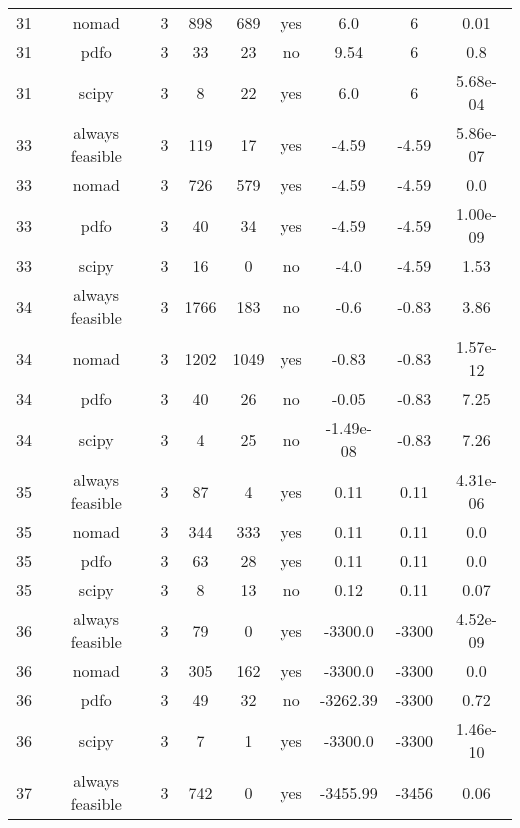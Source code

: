 \begin{scriptsize}
\begin{center}
\begin{longtable}{ccccccccc}
 31 &           nomad &  3 &    898 &    689 &     yes &         6.0 &           6 &     0.01\\
 31 &            pdfo &  3 &     33 &     23 &      no &        9.54 &           6 &      0.8\\
 31 &           scipy &  3 &      8 &     22 &     yes &         6.0 &           6 & 5.68e-04\\
 33 & always feasible &  3 &    119 &     17 &     yes &       -4.59 &       -4.59 & 5.86e-07\\
 33 &           nomad &  3 &    726 &    579 &     yes &       -4.59 &       -4.59 &      0.0\\
 33 &            pdfo &  3 &     40 &     34 &     yes &       -4.59 &       -4.59 & 1.00e-09\\
 33 &           scipy &  3 &     16 &      0 &      no &        -4.0 &       -4.59 &     1.53\\
 34 & always feasible &  3 &   1766 &    183 &      no &        -0.6 &       -0.83 &     3.86\\
 34 &           nomad &  3 &   1202 &   1049 &     yes &       -0.83 &       -0.83 & 1.57e-12\\
 34 &            pdfo &  3 &     40 &     26 &      no &       -0.05 &       -0.83 &     7.25\\
 34 &           scipy &  3 &      4 &     25 &      no &   -1.49e-08 &       -0.83 &     7.26\\
 35 & always feasible &  3 &     87 &      4 &     yes &        0.11 &        0.11 & 4.31e-06\\
 35 &           nomad &  3 &    344 &    333 &     yes &        0.11 &        0.11 &      0.0\\
 35 &            pdfo &  3 &     63 &     28 &     yes &        0.11 &        0.11 &      0.0\\
 35 &           scipy &  3 &      8 &     13 &      no &        0.12 &        0.11 &     0.07\\
 36 & always feasible &  3 &     79 &      0 &     yes &     -3300.0 &       -3300 & 4.52e-09\\
 36 &           nomad &  3 &    305 &    162 &     yes &     -3300.0 &       -3300 &      0.0\\
 36 &            pdfo &  3 &     49 &     32 &      no &    -3262.39 &       -3300 &     0.72\\
 36 &           scipy &  3 &      7 &      1 &     yes &     -3300.0 &       -3300 & 1.46e-10\\
 37 & always feasible &  3 &    742 &      0 &     yes &    -3455.99 &       -3456 &     0.06\\

\end{longtable}
\end{center}
\end{scriptsize}
